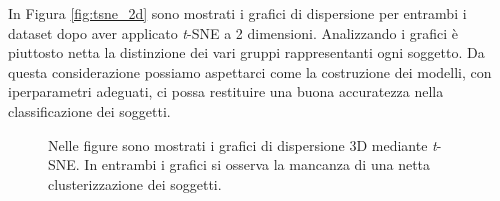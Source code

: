 \documentclass[12pt,italian]{report}
\begin{document}
In Figura \ref{fig:tsne_2d} sono mostrati i grafici di dispersione per entrambi i dataset dopo aver applicato \emph{t}-SNE a 2 dimensioni. Analizzando i grafici è piuttosto netta la distinzione dei vari gruppi rappresentanti ogni soggetto. Da questa considerazione possiamo aspettarci come la costruzione dei modelli, con  iperparametri adeguati, ci possa restituire una buona accuratezza nella classificazione dei soggetti.

\begin{figure}
	\centering
	\caption{Nelle figure sono mostrati i grafici di dispersione 3D mediante \emph{t}-SNE. In entrambi i grafici si osserva la mancanza di una netta clusterizzazione dei soggetti.}
	\label{fig:tsne_3d}
\end{figure}
\end{document}
